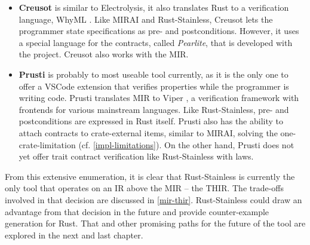 \begin{itemize}
\item \textbf{Creusot} \cite{creusot} is similar to Electrolysis, it also
translates Rust to a verification language, WhyML \cite{why3}. Like MIRAI and
Rust-Stainless, Creusot lets  the programmer state specifications as pre- and
postconditions. However, it uses a special language for the contracts, called
\emph{Pearlite}, that is developed with the project. Creusot also works with the
MIR.

\item \textbf{Prusti} \cite{prusti} is probably to most useable tool currently,
as it is the only one  to offer a VSCode extension that verifies properties
while the programmer is writing code. Prusti translates MIR to Viper
\cite{viper}, a verification framework with frontends for various mainstream
languages. Like Rust-Stainless, pre- and postconditions are expressed in Rust
itself. Prusti also has the ability to attach contracts to crate-external items,
similar to MIRAI, solving the one-crate-limitation (cf.
\autoref{impl-limitations}). On the other hand, Prusti does not yet offer trait
contract verification like Rust-Stainless with laws.

\end{itemize}

\hfill \break \noindent  From this extensive enumeration, it is clear that
Rust-Stainless is currently the only tool that operates on an IR above the MIR
-- the THIR. The trade-offs involved in that decision are discussed in
\autoref{mir-thir}. Rust-Stainless could draw an advantage from that decision in
the future and provide counter-example generation for Rust. That and other
promising paths for the future of the tool are explored in the next and last
chapter.
